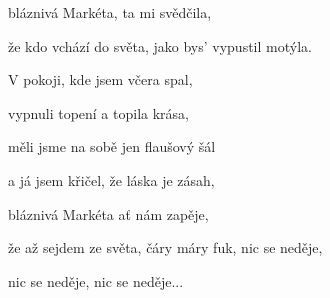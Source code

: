 bláznivá Markéta, ta mi svědčila,

že kdo vchází do světa, jako bys' vypustil motýla.
\ks

\zr \kr


\zs
V pokoji, kde jsem včera spal,

vypnuli topení a topila krása,

měli jsme na sobě jen flaušový šál

a já jsem křičel, že láska je zásah,

bláznivá Markéta ať nám zapěje,

že až sejdem ze světa, čáry máry fuk, nic se neděje,

nic se neděje, nic se neděje...
\ks

\kp







